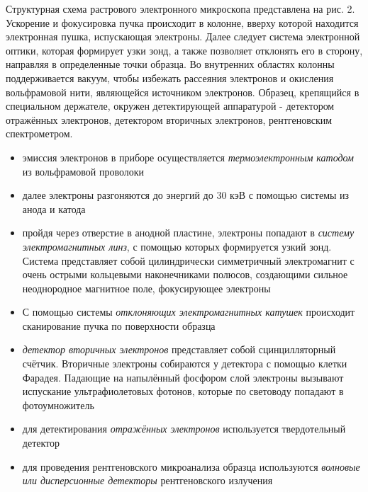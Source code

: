 \documentclass[a4paper]{article}
\begin{document}
Структурная схема растрового электронного микроскопа представлена на рис. 2. Ускорение и фокусировка пучка происходит в колонне, вверху которой находится электронная пушка, испускающая электроны. Далее следует система электронной оптики, которая формирует узки зонд, а также позволяет отклонять его в сторону, направляя в определенные точки образца. Во внутренних областях колонны поддерживается вакуум, чтобы избежать рассеяния электронов и окисления вольфрамовой нити, являющейся источником электронов. Образец, крепящийся в специальном держателе, окружен детектирующей аппаратурой - детектором отражённых электронов, детектором вторичных электронов, рентгеновским спектрометром.
\begin{itemize}
    \item эмиссия электронов в приборе осуществляется \textit{термоэлектронным катодом} из вольфрамовой проволоки
    \item далее электроны разгоняются до энергий до 30 кэВ с помощью системы из анода и катода
    \item пройдя через отверстие в анодной пластине, электроны попадают в \textit{систему электромагнитных линз}, с помощью которых формируется узкий зонд. Система представляет собой цилиндрически симметричный электромагнит с очень острыми кольцевыми наконечниками полюсов, создающими сильное неоднородное магнитное поле, фокусирующее электроны
    \item С помощью системы \textit{отклоняющих электромагнитных катушек} происходит сканирование пучка по поверхности образца
    \item \textit{детектор вторичных электронов} представляет собой сцинцилляторный счётчик. Вторичные электроны собираются у детектора с помощью клетки Фарадея. Падающие на напылённый фосфором слой электроны вызывают испускание ультрафиолетовых фотонов, которые по световоду попадают в фотоумножитель
    \item для детектирования \textit{отражённых электронов} используется твердотельный детектор 
    \item для проведения рентгеновского микроанализа образца используются \textit{волновые или дисперсионные детекторы} рентгеновского излучения
\end{itemize}

\clearpage
\end{document}
